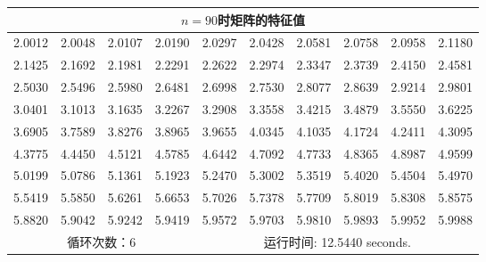 \documentclass{article}
\begin{document}
\begin{table}[H]
	\centering
	\begin{tabular}{|*{10}{c|}}
		\hline
		\multicolumn{10}{|c|}{$n=90$时矩阵的特征值} \\ \hline
		2.0012 & 2.0048 & 2.0107 & 2.0190 & 2.0297 & 2.0428 & 2.0581 & 2.0758 & 2.0958 & 2.1180 \\ \hline
		2.1425 & 2.1692 & 2.1981 & 2.2291 & 2.2622 & 2.2974 & 2.3347 & 2.3739 & 2.4150 & 2.4581 \\ \hline
		2.5030 & 2.5496 & 2.5980 & 2.6481 & 2.6998 & 2.7530 & 2.8077 & 2.8639 & 2.9214 & 2.9801 \\ \hline
		3.0401 & 3.1013 & 3.1635 & 3.2267 & 3.2908 & 3.3558 & 3.4215 & 3.4879 & 3.5550 & 3.6225 \\ \hline
		3.6905 & 3.7589 & 3.8276 & 3.8965 & 3.9655 & 4.0345 & 4.1035 & 4.1724 & 4.2411 & 4.3095 \\ \hline
		4.3775 & 4.4450 & 4.5121 & 4.5785 & 4.6442 & 4.7092 & 4.7733 & 4.8365 & 4.8987 & 4.9599 \\ \hline
		5.0199 & 5.0786 & 5.1361 & 5.1923 & 5.2470 & 5.3002 & 5.3519 & 5.4020 & 5.4504 & 5.4970 \\ \hline
		5.5419 & 5.5850 & 5.6261 & 5.6653 & 5.7026 & 5.7378 & 5.7709 & 5.8019 & 5.8308 & 5.8575 \\ \hline
		5.8820 & 5.9042 & 5.9242 & 5.9419 & 5.9572 & 5.9703 & 5.9810 & 5.9893 & 5.9952 & 5.9988 \\ \hline
		\multicolumn{4}{|c|}{循环次数：6} & \multicolumn{6}{c|}{运行时间: 12.5440 seconds.} \\ \hline
	\end{tabular}
\end{table}
\end{document}
